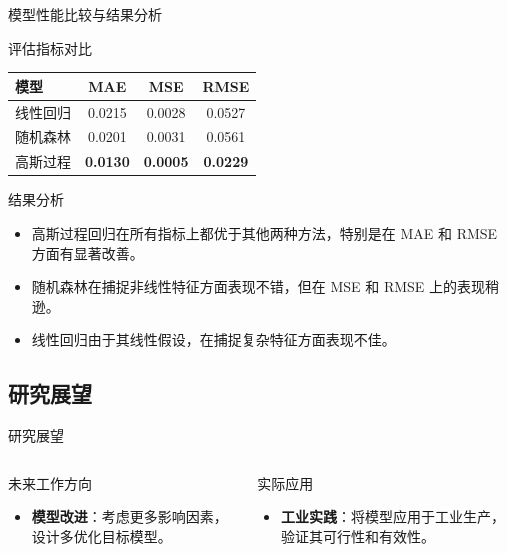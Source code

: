 \documentclass{beamer}
\begin{document}
\begin{frame}{模型性能比较与结果分析}

    \begin{block}{评估指标对比}
        \centering
        \begin{tabular}{lccc}
            \toprule
            \textbf{模型} & \textbf{MAE} & \textbf{MSE} & \textbf{RMSE} \\
            \midrule
            线性回归 & 0.0215 & 0.0028 & 0.0527 \\
            随机森林 & 0.0201 & 0.0031 & 0.0561 \\
            高斯过程 & \textbf{0.0130} & \textbf{0.0005} & \textbf{0.0229} \\
            \bottomrule
        \end{tabular}
    \end{block}

    \vspace{0.1cm} %

    \begin{block}{结果分析}
        \begin{itemize}
            \item 高斯过程回归在所有指标上都优于其他两种方法，特别是在 MAE 和 RMSE 方面有显著改善。
            \item 随机森林在捕捉非线性特征方面表现不错，但在 MSE 和 RMSE 上的表现稍逊。
            \item 线性回归由于其线性假设，在捕捉复杂特征方面表现不佳。
        \end{itemize}
    \end{block}
\end{frame}

\subsection{研究展望}
\begin{frame}{研究展望}
    \justifying
    \begin{columns}
        \begin{block}{未来工作方向}
            \begin{itemize}
                \item \textbf{模型改进}：考虑更多影响因素，设计多优化目标模型。
            \end{itemize}
        \end{block}
        \begin{block}{实际应用}
            \begin{itemize}
                \item \textbf{工业实践}：将模型应用于工业生产，验证其可行性和有效性。
            \end{itemize}
        \end{block}
    \end{columns}
\end{frame}
\end{document}
